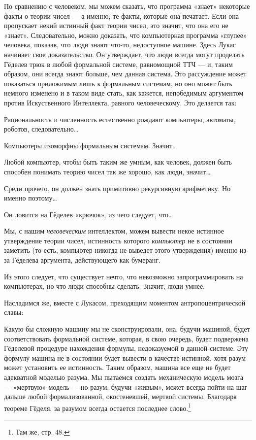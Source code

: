 \documentclass[../main.tex]{subfiles}
\begin{document}
По сравнению с человеком, мы можем сказать, что программа «знает» некоторые факты о теории чисел --- а именно, те факты, которые она печатает. Если она пропускает некий истинный факт теории чисел, это значит, что она его не «знает». Следовательно, можно доказать, что компьютерная программа «глупее» человека, показав, что люди знают что-то, недоступное машине. Здесь Лукас начинает свое доказательство. Он утверждает, что люди всегда могут проделать Гёделев трюк в любой формальной системе, равномощной ТТЧ --- и, таким образом, они всегда знают больше, чем данная система. Это рассуждение может показаться приложимым лишь к формальным системам, но оно может быть немного изменено и в таком виде стать, как кажется, непобедимым аргументом против Искуственного Интеллекта, равного человеческому. Это делается так:

Рациональность и численность естественно рождают компьютеры, автоматы, роботов, следовательно\ldots{}

Компьютеры изоморфны формальным системам. Значит\ldots{}

Любой компьютер, чтобы быть таким же умным, как человек, должен быть способен понимать теорию чисел так же хорошо, как люди, значит\ldots{}

Среди прочего, он должен знать примитивно рекурсивную арифметику. Но именно поэтому\ldots{}

Он ловится на Гёделев «крючок», из чего следует, что\ldots{}

Мы, с нашим \emph{человеческим} интеллектом, можем вывести некое истинное утверждение теории чисел, истинность которого \emph{компьютер} не в состоянии заметить (то есть, компьютер никогда не выведет этого утверждения) именно из-за Гёделева аргумента, действующего как бумеранг.

Из этого следует, что существует нечто, что невозможно запрограммировать на компьютерах, но что люди способны сделать. Значит, люди умнее.

Насладимся же, вместе с Лукасом, преходящим моментом антропоцентрической славы:

Какую бы сложную машину мы не сконструировали, она, будучи машиной, будет соответствовать формальной системе, которая, в свою очередь, будет подвержена Гёделевой процедуре нахождения формулы, недоказуемой в данной-системе. Эту формулу машина не в состоянии будет вывести в качестве истинной, хотя разум может установить ее истинность. Таким образом, машина все еще не будет адекватной моделью разума. Мы пытаемся создать механическую модель мозга --- «мертвую» модель --- но разум, будучи «живым», может всегда пойти на шаг дальше любой формализованной, окостеневшей, мертвой системы. Благодаря теореме Гёделя, за разумом всегда остается последнее слово.\footnote{Там же, стр. 48.}
\end{document}
